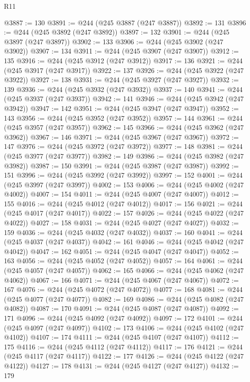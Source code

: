 \begin{lexlean}{R11}
\begin{coremodule}
@3887 := 130
@3891 := @244 (@245 @3887 (@247 @3887))
@3892 := 131
@3896 := @244 (@245 @3892 (@247 @3892))
@3897 := 132
@3901 := @244 (@245 @3897 (@247 @3897))
@3902 := 133
@3906 := @244 (@245 @3902 (@247 @3902))
@3907 := 134
@3911 := @244 (@245 @3907 (@247 @3907))
@3912 := 135
@3916 := @244 (@245 @3912 (@247 @3912))
@3917 := 136
@3921 := @244 (@245 @3917 (@247 @3917))
@3922 := 137
@3926 := @244 (@245 @3922 (@247 @3922))
@3927 := 138
@3931 := @244 (@245 @3927 (@247 @3927))
@3932 := 139
@3936 := @244 (@245 @3932 (@247 @3932))
@3937 := 140
@3941 := @244 (@245 @3937 (@247 @3937))
@3942 := 141
@3946 := @244 (@245 @3942 (@247 @3942))
@3947 := 142
@3951 := @244 (@245 @3947 (@247 @3947))
@3952 := 143
@3956 := @244 (@245 @3952 (@247 @3952))
@3957 := 144
@3961 := @244 (@245 @3957 (@247 @3957))
@3962 := 145
@3966 := @244 (@245 @3962 (@247 @3962))
@3967 := 146
@3971 := @244 (@245 @3967 (@247 @3967))
@3972 := 147
@3976 := @244 (@245 @3972 (@247 @3972))
@3977 := 148
@3981 := @244 (@245 @3977 (@247 @3977))
@3982 := 149
@3986 := @244 (@245 @3982 (@247 @3982))
@3987 := 150
@3991 := @244 (@245 @3987 (@247 @3987))
@3992 := 151
@3996 := @244 (@245 @3992 (@247 @3992))
@3997 := 152
@4001 := @244 (@245 @3997 (@247 @3997))
@4002 := 153
@4006 := @244 (@245 @4002 (@247 @4002))
@4007 := 154
@4011 := @244 (@245 @4007 (@247 @4007))
@4012 := 155
@4016 := @244 (@245 @4012 (@247 @4012))
@4017 := 156
@4021 := @244 (@245 @4017 (@247 @4017))
@4022 := 157
@4026 := @244 (@245 @4022 (@247 @4022))
@4027 := 158
@4031 := @244 (@245 @4027 (@247 @4027))
@4032 := 159
@4036 := @244 (@245 @4032 (@247 @4032))
@4037 := 160
@4041 := @244 (@245 @4037 (@247 @4037))
@4042 := 161
@4046 := @244 (@245 @4042 (@247 @4042))
@4047 := 162
@4051 := @244 (@245 @4047 (@247 @4047))
@4052 := 163
@4056 := @244 (@245 @4052 (@247 @4052))
@4057 := 164
@4061 := @244 (@245 @4057 (@247 @4057))
@4062 := 165
@4066 := @244 (@245 @4062 (@247 @4062))
@4067 := 166
@4071 := @244 (@245 @4067 (@247 @4067))
@4072 := 167
@4076 := @244 (@245 @4072 (@247 @4072))
@4077 := 168
@4081 := @244 (@245 @4077 (@247 @4077))
@4082 := 169
@4086 := @244 (@245 @4082 (@247 @4082))
@4087 := 170
@4091 := @244 (@245 @4087 (@247 @4087))
@4092 := 171
@4096 := @244 (@245 @4092 (@247 @4092))
@4097 := 172
@4101 := @244 (@245 @4097 (@247 @4097))
@4102 := 173
@4106 := @244 (@245 @4102 (@247 @4102))
@4107 := 174
@4111 := @244 (@245 @4107 (@247 @4107))
@4112 := 175
@4116 := @244 (@245 @4112 (@247 @4112))
@4117 := 176
@4121 := @244 (@245 @4117 (@247 @4117))
@4122 := 177
@4126 := @244 (@245 @4122 (@247 @4122))
@4127 := 178
@4131 := @244 (@245 @4127 (@247 @4127))
@4132 := 179

\end{coremodule}
\end{lexlean}
